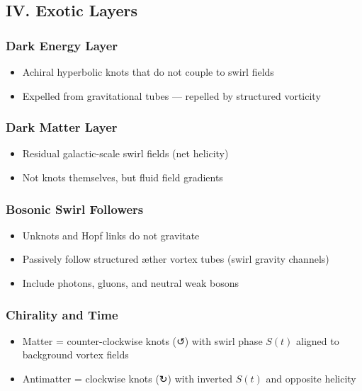 \documentclass[12pt]{article}
\begin{document}
\subsection*{IV. Exotic Layers}

\subsubsection*{Dark Energy Layer}
\begin{itemize}
    \item Achiral hyperbolic knots that do not couple to swirl fields
    \item Expelled from gravitational tubes — repelled by structured vorticity
\end{itemize}

\subsubsection*{Dark Matter Layer}
\begin{itemize}
    \item Residual galactic-scale swirl fields (net helicity)
    \item Not knots themselves, but fluid field gradients
\end{itemize}

\subsubsection*{Bosonic Swirl Followers}
\begin{itemize}
    \item Unknots and Hopf links do not gravitate
    \item Passively follow structured æther vortex tubes (swirl gravity channels)
    \item Include photons, gluons, and neutral weak bosons
\end{itemize}

\subsubsection*{Chirality and Time}

\begin{itemize}
    \item Matter = counter-clockwise knots (↺) with swirl phase $S(t)$ aligned to background vortex fields
    \item Antimatter = clockwise knots (↻) with inverted $S(t)$ and opposite helicity
\end{itemize}
\end{document}
